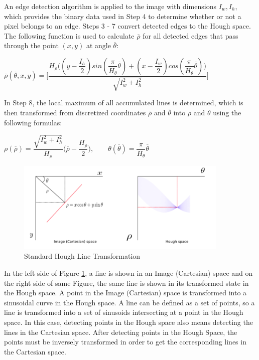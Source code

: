  
An edge detection algorithm is applied to the image with dimensions $I_{w}, I_{h}$, which provides the binary data used in Step 4 to determine whether or not a pixel belongs to an edge. Steps 3 - 7 convert detected edges to the Hough space. The following function is used to calculate $\overline{\rho}$ for all detected edges that pass through the point $(x,y)$ at angle $\overline{\theta}$: 
 
 
 \begin{center}
 
 
 \emph{\color{green}$ \overline{\rho}(\overline{\theta},x,y) = \Bigg[\dfrac{H_{\rho}\big((y-\dfrac{I_{h}}{2})sin(\dfrac{\pi}{H_{\theta}}\overline{\theta})+(x-\dfrac{I_{w}}{2})cos(\dfrac{\pi}{H_{\theta}}\overline{\theta})\big)}{\sqrt{I^{2}_{w}+I^{2}_{h}}}\Bigg] $ }
 \end{center}
 
In Step 8, the local maximum of all accumulated lines is determined, which is then transformed from discretized coordinates $\overline{\rho}$ and $\overline{\theta}$ into $\rho$ and $\theta$ using the following formulas:   
  
 \begin{center}

$ \rho(\overline{\rho}) = \dfrac{\sqrt{I^{2}_{w} + I^{2}_{h} }}{H_{\rho}} \bigg(\overline{\rho}-\dfrac{H_{\rho}}{2}\bigg)   ,  \qquad              \theta(\overline{\theta})=\dfrac{\pi}{H_{\theta}}\overline{\theta} $
 
 \end{center}
 
 \begin{figure}[H]
 \centering
  \includegraphics[width=0.9\textwidth]{./Bilder/Standard_Hough_Line_Transformation.png}
  \caption{Standard Hough Line Transformation\cite{Standard_Hough_Transformation}}
  \label{Standard_Hough_Line_Transformation_fig}
\end{figure}
 
 In the left side of Figure \ref{Standard_Hough_Line_Transformation_fig}, a line is shown in an Image (Cartesian) space and on the right side of same Figure, the same line is shown in its transformed state in the Hough space. A point in the Image (Cartesian) space is transformed into a sinusoidal curve in the Hough space. A line can be defined as a set of points, so a line is transformed into a set of sinusoids intersecting at a point in the Hough space. In this case, detecting points in the Hough space also means detecting the lines in the Cartesian space. After detecting points in the Hough Space, the points must be inversely transformed in order to get the corresponding lines in the Cartesian space.
 
